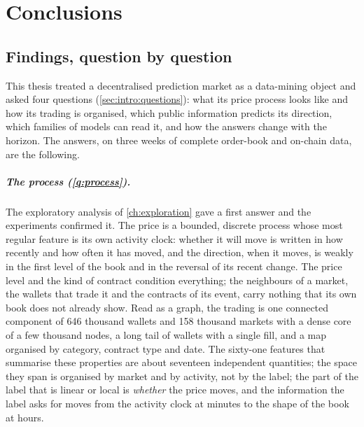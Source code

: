\chapter{Conclusions}
\label{ch:conclusions}

\section{Findings, question by question}
\label{sec:concl:summary}
\label{sec:horizons:questions}

This thesis treated a decentralised prediction market as a data-mining object and asked
four questions (\cref{sec:intro:questions}): what its price process looks like and how its
trading is organised, which public information predicts its direction, which families of
models can read it, and how the answers change with the horizon.  The answers, on three
weeks of complete order-book and on-chain data, are the following.

\paragraph{The process (\ref{q:process}).}  The exploratory analysis of \cref{ch:exploration}
gave a first answer and the experiments confirmed it.  The price is a bounded, discrete
process whose most regular feature is its own activity clock: whether it will move is
written in how recently and how often it has moved, and the direction, when it moves, is
weakly in the first level of the book and in the reversal of its recent change.  The price
level and the kind of contract condition everything; the neighbours of a market, the
wallets that trade it and the contracts of its event, carry nothing that its own book does
not already show.  Read as a graph, the trading is one connected component of 646 thousand
wallets and 158 thousand markets with a dense core of a few thousand nodes, a long tail of
wallets with a single fill, and a map organised by category, contract type and date.  The
sixty-one features that summarise these properties are about seventeen independent
quantities; the space they span is organised by market and by activity, not by the label;
the part of the label that is linear or local is \emph{whether} the price moves, and the
information the label asks for moves from the activity clock at minutes to the shape of the
book at hours.

